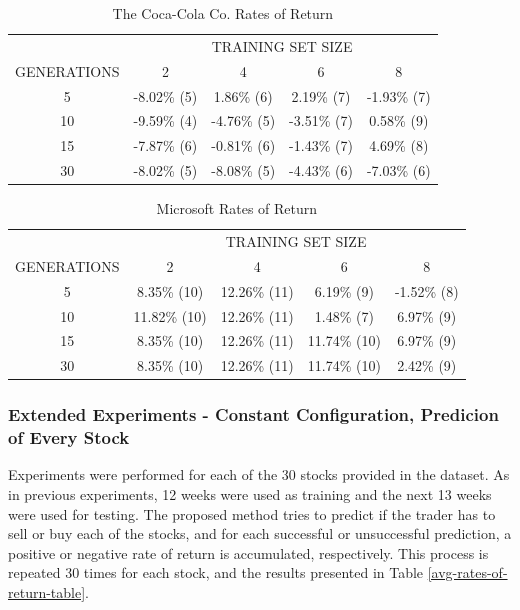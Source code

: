 \documentclass[12pt,journal,compsoc]{IEEEtran}
\begin{document}
\begin{table}
\caption{{The Coca-Cola Co. Rates of Return}}
\label{ko-ror-table}
    \begin{tabular}{ c c c c c }
         & \multicolumn{4}{c}{TRAINING SET SIZE} \\ 
        GENERATIONS & 2            & 4           & 6             & 8           \\ 
        5           & -8.02\% (5)  & 1.86\% (6)  & 2.19\% (7)    & -1.93\% (7) \\ 
        10          & -9.59\% (4)  & -4.76\% (5) & -3.51\% (7)   & 0.58\% (9) \\ 
        15          & -7.87\% (6)  & -0.81\% (6) & -1.43\% (7)   & 4.69\% (8) \\ 
        30          & -8.02\% (5)  & -8.08\% (5) & -4.43\% (6)   & -7.03\% (6)  \\ 
    \end{tabular} 
\end{table}

\begin{table}
\caption{{Microsoft Rates of Return}}
\label{msft-ror-table}
    \begin{tabular}{ c c c c c }
         & \multicolumn{4}{c}{TRAINING SET SIZE} \\ 
        GENERATIONS & 2            & 4           & 6             & 8           \\ 
        5           & 8.35\% (10)  & 12.26\% (11) & 6.19\% (9)   & -1.52\% (8) \\ 
        10          & 11.82\% (10) & 12.26\% (11) & 1.48\% (7)   & 6.97\% (9) \\ 
        15          & 8.35\% (10)  & 12.26\% (11) & 11.74\% (10) & 6.97\% (9) \\ 
        30          & 8.35\% (10)  & 12.26\% (11) & 11.74\% (10) & 2.42\% (9)  \\ 
    \end{tabular} 
\end{table}

\subsubsection{Extended Experiments - Constant Configuration, Predicion of Every Stock}

Experiments were performed for each of the 30 stocks provided in the dataset. As in previous experiments, 12 weeks were used as training and the next 13 weeks were used for testing. The proposed method tries to predict if the trader has to sell or buy each of the stocks, and for each successful or unsuccessful prediction, a positive or negative rate of return is accumulated, respectively. This process is repeated 30 times for each stock, and the results presented in Table \ref{avg-rates-of-return-table}.
\end{document}
